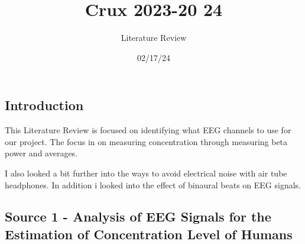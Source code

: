\documentclass[a4paper]{article}
\title{Crux 2023-20 24}
\author{Literature Review}
\date{02/17/24}
\begin{document}
\maketitle


\subsection*{Introduction}

This Literature Review is focused on identifying what EEG channels to use for our project. The focus in on measuring concentration through measuring beta power and averages.

I also looked a bit further into the ways to avoid electrical noise with air tube headphones. In addition i looked into the effect of binaural beats on EEG signals.

\subsection*{Source 1 - Analysis of EEG Signals for the Estimation of Concentration Level of Humans}
\end{document}
